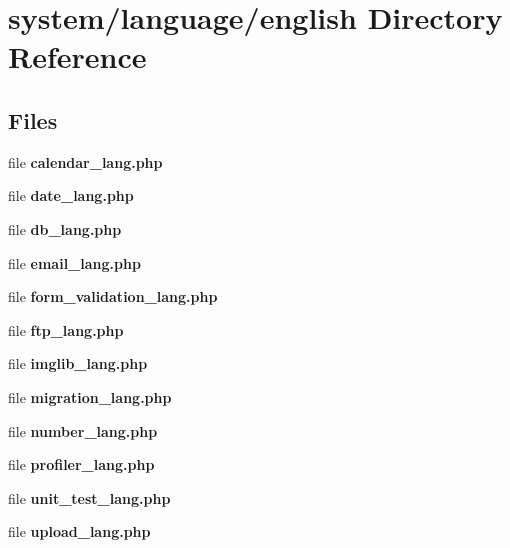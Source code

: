 \section{system/language/english Directory Reference}
\label{dir_87efb2ebd06395f281b413855ee4c145}
\subsection*{Files}
\begin{DoxyCompactItemize}
\item 
file {\bf calendar\-\_\-lang.\-php}
\item 
file {\bf date\-\_\-lang.\-php}
\item 
file {\bf db\-\_\-lang.\-php}
\item 
file {\bf email\-\_\-lang.\-php}
\item 
file {\bf form\-\_\-validation\-\_\-lang.\-php}
\item 
file {\bf ftp\-\_\-lang.\-php}
\item 
file {\bf imglib\-\_\-lang.\-php}
\item 
file {\bf migration\-\_\-lang.\-php}
\item 
file {\bf number\-\_\-lang.\-php}
\item 
file {\bf profiler\-\_\-lang.\-php}
\item 
file {\bf unit\-\_\-test\-\_\-lang.\-php}
\item 
file {\bf upload\-\_\-lang.\-php}
\end{DoxyCompactItemize}
